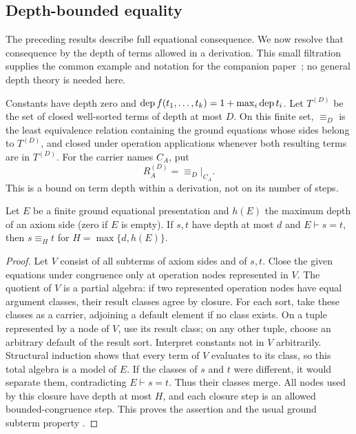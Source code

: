 \subsection{Depth-bounded equality}\label{sec:visibility}

The preceding results describe full equational consequence. We now resolve
that consequence by the depth of terms allowed in a derivation. This small
filtration supplies the common example and notation for the companion
paper~\cite{ShcherbakovII}; no general depth theory is needed here.

Constants have depth zero and
$\operatorname{dep} f(t_1,\ldots,t_k)=1+\max_i\operatorname{dep} t_i$.
Let $T^{(D)}$ be the set of closed well-sorted terms of depth at most $D$.
On this finite set, $\equiv_D$ is the least equivalence relation containing
the ground equations whose sides belong to $T^{(D)}$, and closed under
operation applications whenever both resulting terms are in $T^{(D)}$.
For the carrier names $C_A$, put
\[
R_A^{(D)}=\equiv_D\big|_{C_A}.
\]
This is a bound on term depth within a derivation, not on its number of steps.

\begin{lemma}\label{lem:locality}
Let $E$ be a finite ground equational presentation and $h(E)$ the maximum
depth of an axiom side (zero if $E$ is empty). If $s,t$ have depth at most
$d$ and $E\vdash s=t$, then $s\equiv_H t$ for
$H=\max\{d,h(E)\}$.
\end{lemma}

\begin{proof}
Let $V$ consist of all subterms of axiom sides and of $s,t$. Close the given
equations under congruence only at operation nodes represented in $V$.
The quotient of $V$ is a partial algebra: if two represented operation
nodes have equal argument classes, their result classes agree by closure.
For each sort, take these classes as a carrier, adjoining a default element
if no class exists. On a tuple represented by a node of $V$, use its result
class; on any other tuple, choose an arbitrary default of the result sort.
Interpret constants not in $V$ arbitrarily.
Structural induction shows that every term of $V$ evaluates to its class,
so this total algebra is a model of $E$. If the classes of $s$ and $t$ were
different, it would separate them, contradicting $E\vdash s=t$.
Thus their classes merge. All nodes used by this closure have depth at most
$H$, and each closure step is an allowed bounded-congruence step.
This proves the assertion and the usual ground subterm property
\cite{NelsonOppen1980,DowneySethiTarjan1980}.
\end{proof}

